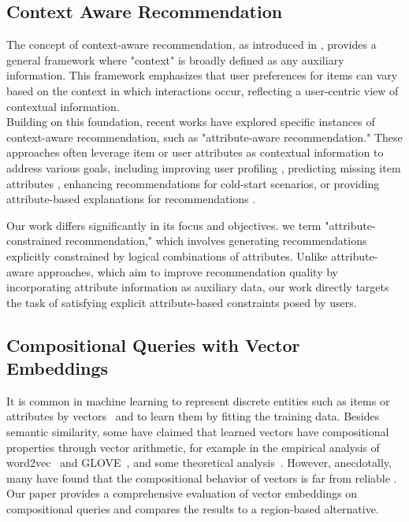 \subsection{Context Aware Recommendation}
{The concept of context-aware recommendation, as introduced in \cite{context-aware-rec-user-context}, provides a general framework where "context" is broadly defined as any auxiliary information. This framework emphasizes that user preferences for items can vary based on the context in which interactions occur, reflecting a user-centric view of contextual information.\\
Building on this foundation, recent works have explored specific instances of context-aware recommendation, such as "attribute-aware recommendation." These approaches often leverage item or user attributes as contextual information to address various goals, including improving user profiling \citep{context-aware-rec-user-context}, predicting missing item attributes \citep{attribute-aware-rec-gcn, attribute-aware-rec-multi-view-graph}, enhancing recommendations for cold-start scenarios\citep{attribute-aware-rec-cold-start-problems}, or providing attribute-based explanations for recommendations \citep{attribute-aware-rec-explainability}.}

{Our work differs significantly in its focus and objectives. we term "attribute-constrained recommendation," which involves generating recommendations explicitly constrained by logical combinations of attributes. Unlike attribute-aware approaches, which aim to improve recommendation quality by incorporating attribute information as auxiliary data, our work directly targets the task of satisfying explicit attribute-based constraints posed by users.} 


\subsection{Compositional Queries with Vector Embeddings}
It is common in machine learning to represent discrete entities such as items or attributes by vectors~\cite{bengio2013representation} and to learn them by fitting the training data. Besides semantic similarity, some have claimed that learned vectors have compositional properties through vector arithmetic, for example in the empirical analysis of word2vec~\cite{mikolov2013efficient} and GLOVE~\cite{pennington2014glove}, and some theoretical analysis~\cite{levy2014neural,arora2018linear}.  However, anecdotally, many have found that the compositional behavior of vectors is far from reliable \cite{rogers-etal-2017-many}.  Our paper provides a comprehensive evaluation of vector embeddings on compositional queries and compares the results to a region-based alternative.


